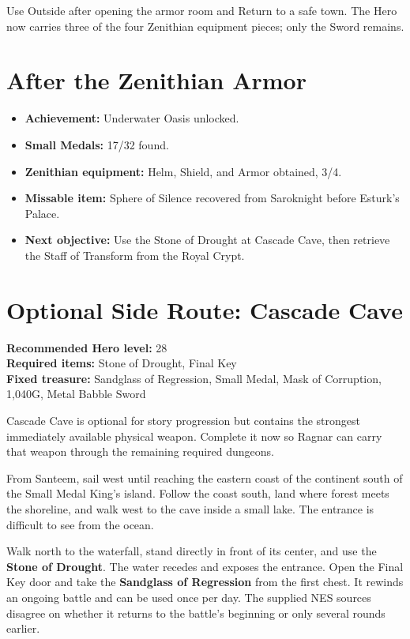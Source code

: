 \documentclass[
  american,
  10pt,
  letterpaper,
  oneside,
  open=any]{scrreprt}
\providecommand{\tightlist}{%
  \setlength{\itemsep}{0pt}\setlength{\parskip}{0pt}}
\newenvironment{guidetable}{%
  \small\setstretch{1.0}%
  \setlength{\tabcolsep}{4pt}%
  \setlength{\LTpre}{8pt}\setlength{\LTpost}{10pt}%
  \renewcommand{\arraystretch}{1.16}%
}{ }
\begin{document}
\begin{guidetable}
\end{guidetable}

Use Outside after opening the armor room and Return to a safe town. The
Hero now carries three of the four Zenithian equipment pieces; only the
Sword remains.

\section{After the Zenithian Armor}\label{after-the-zenithian-armor}

\begin{itemize}
\tightlist
\item
  \textbf{Achievement:} Underwater Oasis unlocked.
\item
  \textbf{Small Medals:} 17/32 found.
\item
  \textbf{Zenithian equipment:} Helm, Shield, and Armor obtained, 3/4.
\item
  \textbf{Missable item:} Sphere of Silence recovered from Saroknight
  before Esturk's Palace.
\item
  \textbf{Next objective:} Use the Stone of Drought at Cascade Cave,
  then retrieve the Staff of Transform from the Royal Crypt.
\end{itemize}

\section{Optional Side Route: Cascade
Cave}\label{optional-side-route-cascade-cave}

\textbf{Recommended Hero level:} 28\\
\textbf{Required items:} Stone of Drought, Final Key\\
\textbf{Fixed treasure:} Sandglass of Regression, Small Medal, Mask of
Corruption, 1,040G, Metal Babble Sword

Cascade Cave is optional for story progression but contains the
strongest immediately available physical weapon. Complete it now so
Ragnar can carry that weapon through the remaining required dungeons.

From Santeem, sail west until reaching the eastern coast of the
continent south of the Small Medal King's island. Follow the coast
south, land where forest meets the shoreline, and walk west to the cave
inside a small lake. The entrance is difficult to see from the ocean.

Walk north to the waterfall, stand directly in front of its center, and
use the \textbf{Stone of Drought}. The water recedes and exposes the
entrance. Open the Final Key door and take the \textbf{Sandglass of
Regression} from the first chest. It rewinds an ongoing battle and can
be used once per day. The supplied NES sources disagree on whether it
returns to the battle's beginning or only several rounds earlier.
\end{document}
